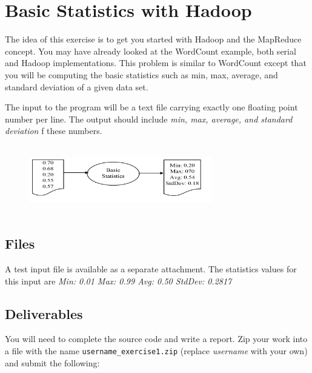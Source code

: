 \FILENAME

\section*{Basic Statistics with Hadoop}       

The idea of this exercise is to get you started with Hadoop and the
MapReduce concept. You may have already looked at the WordCount
example, both serial and Hadoop implementations. This problem is
similar to WordCount except that you will be computing the basic
statistics such as min, max, average, and standard deviation of a
given data set.

The input to the program will be a text file carrying exactly one
floating point number per line. The output should include {\em min,
  max, average, and standard deviation} f these numbers.

\begin{figure}[!htbp]
\includegraphics[width=8cm,height=3cm]{section/icloud/assignment/problems/exercise1/p1example.png}
\centering
\end{figure}

\subsection*{Files}

A test input file is available as a separate attachment.  The
statistics values for this input are {\em Min: 0.01 Max: 0.99 Avg:
  0.50 StdDev: 0.2817}


\subsection*{Deliverables}

You will need to complete the source code and write a report. Zip your
work into a file with the name \verb|username_exercise1.zip| (replace
{\em username} with your own) and submit the following:

